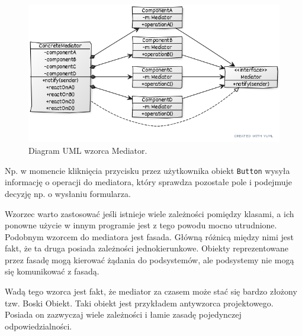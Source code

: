 \begin{figure}[hbt!]
	\centering
	\includegraphics[width=0.9\linewidth]{images/MediatorUml}
	\caption{Diagram UML wzorca Mediator.}
	\label{lab4/fig/MediatorUml}
\end{figure}
%

Np. w momencie kliknięcia przycisku przez użytkownika obiekt \texttt{Button} wysyła informację o operacji do mediatora, który sprawdza pozostałe pole i podejmuje decyzję np. o wysłaniu formularza. 

Wzorzec warto zastosować jeśli istnieje wiele zależności pomiędzy klasami, a ich ponowne użycie w innym programie jest z tego powodu mocno utrudnione. Podobnym wzorcem do mediatora jest fasada. Główną różnicą między nimi jest fakt, że ta druga posiada zależności jednokierunkowe. Obiekty reprezentowane przez fasadę mogą kierować żądania do podsystemów, ale podsystemy nie mogą się komunikować z fasadą.

Wadą tego wzorca jest fakt, że mediator za czasem może stać się bardzo złożony tzw. Boski Obiekt. Taki obiekt jest przykładem antywzorca projektowego. Posiada on zazwyczaj wiele zależności i łamie zasadę pojedynczej odpowiedzialności.
